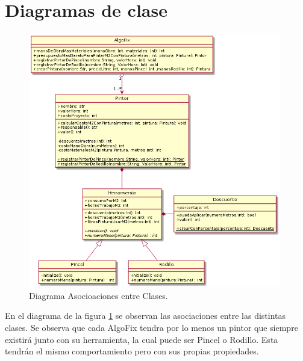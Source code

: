 \documentclass[titlepage,a4paper]{article}
\begin{document}
\section{Diagramas de clase}\label{sec:diagramasdeclase}



\begin{figure}[H]
  \centering
  \includegraphics[width=0.98\textwidth]{diagrama_clase01.png}
  \caption{\label{fig:class01}Diagrama Asocioaciones entre Clases.}
  \end{figure}

  En el diagrama de la figura \ref{fig:class01} se observan las asociaciones entre las distintas clases. 
  Se observa que cada AlgoFix tendra por lo menos un pintor que siempre existirá junto con su herramienta, la cual puede ser Pincel o Rodillo. Esta tendrán el mismo
  comportamiento pero con sus propias propiedades. 
  
\end{document}

